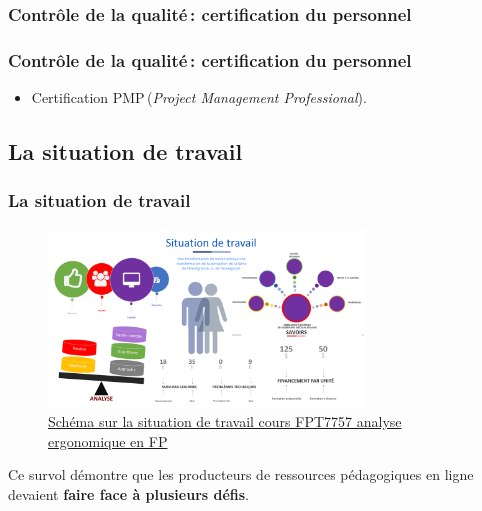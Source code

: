 					\subsubsection{Contrôle de la qualité\,: certification du personnel} 
							\begin{frame}[allowframebreaks]
							\frametitle{Contrôle de la qualité\,: certification du personnel}
                        			
							\begin{itemize}
							\item Certification PMP\textregistered\,(\textit{Project Management Professional}).
							\end{itemize}						
					\end{frame}	
								
				\subsection{La situation de travail} 
						\begin{frame}[allowframebreaks]
						\frametitle{La situation de travail}
                        			\begin{figure}
                     			\centering
                    			 \includegraphics[width = 0.75\textwidth]{situation.png}
                     			\caption{\tiny{\href{run:situation.png}{Schéma sur la situation de travail cours FPT7757 analyse ergonomique en FP}}}
                   			\end{figure}
                        			Ce survol démontre que les producteurs de ressources pédagogiques en ligne devaient \textbf{faire face à plusieurs défis}. 
						
						\end{frame}	
													
